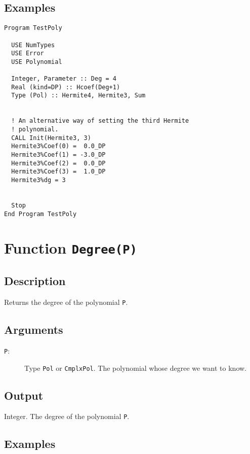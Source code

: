 \subsection{Examples}

\begin{lstlisting}[emph=Init,
                   emphstyle=\color{blue},
                   frame=trBL,
                   caption=Initialising a polynomial data type.,
                   label=initpol]
Program TestPoly

  USE NumTypes
  USE Error
  USE Polynomial

  Integer, Parameter :: Deg = 4
  Real (kind=DP) :: Hcoef(Deg+1)
  Type (Pol) :: Hermite4, Hermite3, Sum


  ! An alternative way of setting the third Hermite
  ! polynomial.
  CALL Init(Hermite3, 3)
  Hermite3%Coef(0) =  0.0_DP
  Hermite3%Coef(1) = -3.0_DP
  Hermite3%Coef(2) =  0.0_DP
  Hermite3%Coef(3) =  1.0_DP
  Hermite3%dg = 3


  Stop
End Program TestPoly
\end{lstlisting}

\section{Function \texttt{Degree(P)}}

\subsection{Description}

Returns the degree of the polynomial \texttt{P}.

\subsection{Arguments}

\begin{description}
\item[\texttt{P}:] Type \texttt{Pol} or \texttt{CmplxPol}. The
  polynomial whose degree we want to know.  
\end{description}

\subsection{Output}

Integer. The degree of the polynomial \texttt{P}.

\subsection{Examples}

